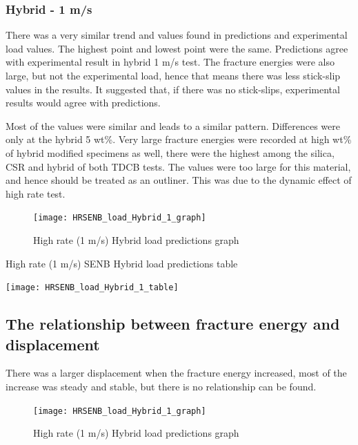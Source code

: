 \documentclass[numbers=noendperiod,chapterprefix=on]{icldt} %
\begin{document}
\subsubsection{Hybrid - 1 m/s}
There was a very similar trend and values found in predictions and experimental load values. The highest point and lowest point were the same. Predictions agree with experimental result in hybrid 1  m/s test. The fracture energies were also large, but not the experimental load, hence that means there was less stick-slip values in the results. It suggested that, if there was no stick-slips, experimental results would agree with predictions.

Most of the values were similar and leads to a similar pattern. Differences were only at the hybrid 5 wt\%.
Very large fracture energies were recorded at high wt\% of hybrid modified specimens as well, there were the highest among the silica, CSR and hybrid of both TDCB tests. The values were too large for this material, and hence should be treated as an outliner. This was due to the dynamic effect of high rate test.

\begin{figure}[!hp]
    \centering
    \texttt{[image: HRSENB\_load\_Hybrid\_1\_graph]}\label{HRSENB_load_Hybrid_1_graph}
    \caption{High rate (1 m/s) Hybrid load predictions graph}
    \end{figure}
   \FloatBarrier
   
   \begin{table}
      \centering
      \caption{High rate (1 m/s) SENB Hybrid load predictions table}\label{HRSENB_load_Hybrid_1_table}
      \texttt{[image: HRSENB\_load\_Hybrid\_1\_table]}
      \end{table}
      \FloatBarrier      

\subsection{The relationship between fracture energy and displacement}       
There was a larger displacement when the fracture energy increased, most of the increase was steady and stable, but there is no relationship can be found. 
   
\begin{figure}[!hp]
    \centering
    \texttt{[image: HRSENB\_load\_Hybrid\_1\_graph]}\label{HRSENB_load_Hybrid_1_graph}
    \caption{High rate (1 m/s) Hybrid load predictions graph}
    \end{figure}
   \FloatBarrier
   
\end{document}
